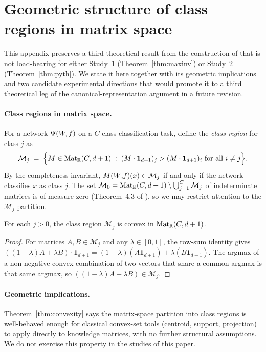 \section{Geometric structure of class regions in matrix space}
\label{app:geometric}

This appendix preserves a third theoretical result from the
construction of \citet{armenta2021representation} that is not
load-bearing for either Study~1 (Theorem~\ref{thm:maxinv}) or
Study~2 (Theorem~\ref{thm:pyth}). We state it here together with
its geometric implications and two candidate experimental directions
that would promote it to a third theoretical leg of the
canonical-representation argument in a future revision.

\paragraph{Class regions in matrix space.}
For a network $\Psi(W\!,f)$ on a $C$-class classification task, define the
\emph{class region} for class $j$ as
\[
\mathcal{M}_j \;=\; \Bigl\{ M \in \mathrm{Mat}_{\mathbb{R}}(C, d+1)
   \;:\; (M \cdot \mathbf{1}_{d+1})_j > (M \cdot \mathbf{1}_{d+1})_i
   \text{ for all } i \neq j \Bigr\}.
\]
By the completeness invariant, $M(W{,}f)(x) \in \mathcal{M}_j$ if and only
if the network classifies $x$ as class $j$. The set $\mathcal{M}_0
= \mathrm{Mat}_{\mathbb{R}}(C, d+1) \setminus \bigcup_{j=1}^{C} \mathcal{M}_j$
of indeterminate matrices is of measure zero
(Theorem~4.3 of \citealt{armenta2021representation}), so we may
restrict attention to the $\mathcal{M}_j$ partition.

\begin{theorem}
\label{thm:convexity}
For each $j > 0$, the class region $\mathcal{M}_j$ is convex in
$\mathrm{Mat}_{\mathbb{R}}(C, d+1)$.
\end{theorem}

\begin{proof}
For matrices $A, B \in \mathcal{M}_j$ and any $\lambda \in [0, 1]$,
the row-sum identity gives $((1-\lambda) A + \lambda B) \cdot
\mathbf{1}_{d+1} = (1-\lambda)(A \mathbf{1}_{d+1}) +
\lambda(B \mathbf{1}_{d+1})$. The argmax of a non-negative convex
combination of two vectors that share a common argmax is that same
argmax, so $((1-\lambda) A + \lambda B) \in \mathcal{M}_j$.
\end{proof}

\paragraph{Geometric implications.}
Theorem~\ref{thm:convexity} says the matrix-space partition into
class regions is well-behaved enough for classical convex-set tools
(centroid, support, projection) to apply directly to knowledge
matrices, with no further structural assumptions. We do not exercise
this property in the studies of this paper.

